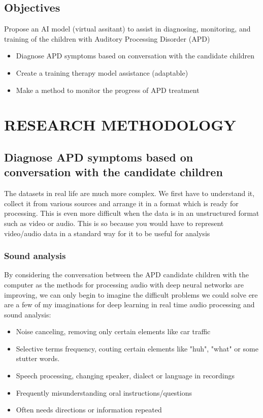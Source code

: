 \documentclass[letterpaper%
, twoside%
, 12pt%
,these%
, english%
,creativecommons,hyperref%
]{thETS}
\begin{document}
\section{Objectives}
Propose an AI model (virtual assitant) to assist in diagnosing, monitoring, and training of the
children with Auditory Processing Disorder (APD)
\begin{itemize}
	\item Diagnose APD symptoms based on conversation with the candidate children
	\item Create a training therapy model assistance (adaptable)
	\item Make a method to monitor the progress of APD treatment
	
\end{itemize}

\chapter{RESEARCH METHODOLOGY}

\section{Diagnose APD symptoms based on conversation with the candidate children}

The datasets in real life are much more complex. We first have to understand it, collect it from
various sources and arrange it in a format which is ready for processing. This is even more
difficult when the data is in an unstructured format such as video or audio. This is so because
you would have to represent video/audio data in a standard way for it to be useful for analysis
\subsection {Sound analysis}
By considering the conversation between the APD candidate children with the computer as the
methods for processing audio with deep neural networks are improving, we can only begin
to imagine the difficult problems we could solve ere are a few of my imaginations for deep
learning in real time audio processing and sound analysis:
\begin{itemize}
	\item  Noise canceling, removing only certain elements like car traffic
	\item  Selective terms frequency, couting certain elements like "huh", "what" or some stutter
	words.
	\item  Speech processing, changing speaker, dialect or language in recordings
	\item  Frequently misunderstanding oral instructions/questions
	\item  Often needs directions or information repeated
\end{itemize}
\end{document}
